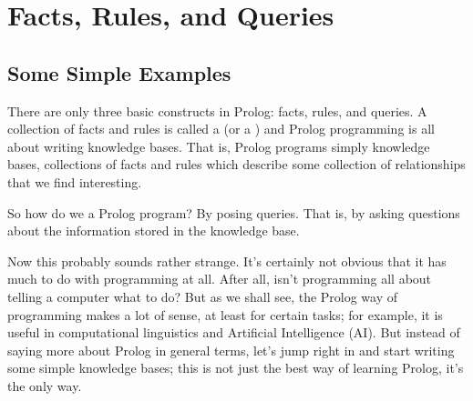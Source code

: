 
\chapter{Facts, Rules, and Queries}\label{CHAPTER1}




\section{Some Simple Examples}\label{SEC.L1.SIMPLE.EX}



There are only three basic constructs in Prolog: facts, rules, and
queries.  A collection of facts and rules is called a
 (or a ) and Prolog
programming is all about writing knowledge bases. That is, Prolog
programs simply  knowledge bases, collections of facts
and rules which describe some collection of relationships that we find
interesting.

So how do we  a Prolog program? By posing queries. That
is, by asking questions about the information stored in the knowledge
base.

Now this probably sounds rather strange. It's certainly not obvious
that it has much to do with programming at all. After all, isn't
programming all about telling a computer what to do?  But as we shall
see, the Prolog way of programming makes a lot of sense, at least for
certain tasks; for example, it is useful in computational linguistics
and Artificial Intelligence (AI).  But instead of saying more about
Prolog in general terms, let's jump right in and start writing some
simple knowledge bases; this is not just the best way of learning
Prolog, it's the only way.



